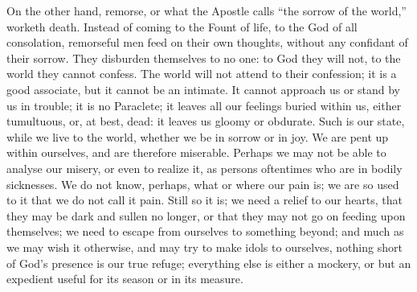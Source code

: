 On the other hand, remorse, or what the Apostle calls ``the
sorrow of the world,'' worketh death. Instead of coming to the
Fount of life, to the God of all consolation, remorseful men feed on
their own thoughts, without any confidant of their sorrow. They
disburden themselves to no one: to God they will not, to the world
they cannot confess. The world will not attend to their confession; it
is a good associate, but it cannot be an intimate. It cannot approach
us or stand by us in trouble; it is no Paraclete; it leaves all our
feelings buried within us, either tumultuous, or, at best, dead: it
leaves us gloomy or obdurate. Such is our state, while we live to the
world, whether we be in sorrow or in joy. We are pent up within
ourselves, and are therefore miserable. Perhaps we may not be able to
analyse our misery, or even to realize it, as persons oftentimes who
are in bodily sicknesses. We do not know, perhaps, what or where our
pain is; we are so used to it that we do not call it pain. Still so it
is; we need a relief to our hearts, that they may be dark and sullen
no longer, or that they may not go on feeding upon themselves; we need
to escape from ourselves to something beyond; and much as we may wish
it otherwise, and may try to make idols to ourselves, nothing short of
God's presence is our true refuge; everything else is either a
mockery, or but an expedient useful for its season or in its measure.

